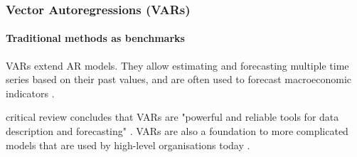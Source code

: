 \begin{frame}
    \frametitle{Vector Autoregressions (VARs)}
    \framesubtitle{Traditional methods as benchmarks}
    \begin{center}
        VARs extend AR models. They allow estimating and forecasting multiple time series based on their past values, and are often used to forecast macroeconomic indicators \parencite{schorfheide_real-time_2015,cambamendez_automatic_2001}.
    \end{center}
    \begin{center}
        \cite{stock_watson} critical review concludes that VARs are "powerful and reliable tools for data description and forecasting" \parencite{stock_watson}. VARs are also a foundation to more complicated models that are used by high-level organisations today \parencite{stock_watson_2017}.
    \end{center}

\end{frame}